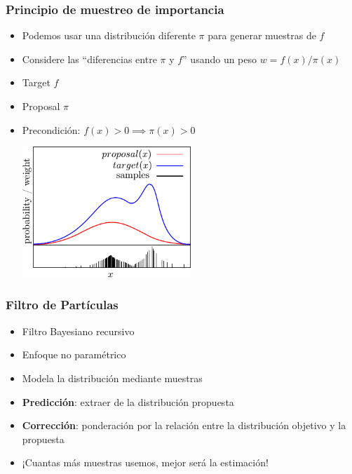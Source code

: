 \begin{frame}
    \frametitle{Principio de muestreo de importancia}
    \begin{itemize}
        \item Podemos usar una distribución diferente $\pi$ para generar muestras de $f$
        \item Considere las ``diferencias entre $\pi$ y $f$'' usando un peso $w = f(x) / \pi(x)$
        \item Target $f$
        \item Proposal $\pi$
        \item Precondición:
        $f(x) > 0 \implies \pi(x) > 0$
        \begin{center}
        \includegraphics[width=0.5\textwidth]{./images/particle_filter/importance_sampling_principle.pdf}
        \end{center}
    \end{itemize}
\end{frame}
    
\begin{frame}
    \frametitle{Filtro de Partículas}
    \begin{itemize}
        \item Filtro Bayesiano recursivo
        \item Enfoque no paramétrico
        \item Modela la distribución mediante muestras
        \item \textbf{Predicción}: extraer de la distribución propuesta
        \item \textbf{Corrección}: ponderación por la relación entre la distribución objetivo y la propuesta
        \item \alert{¡Cuantas más muestras usemos, mejor será la estimación!}
    \end{itemize}
\end{frame}
    
